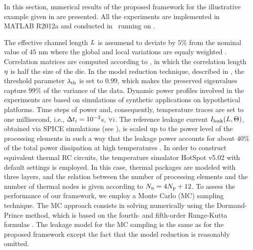 In this section, numerical results of the proposed framework for the illustrative example given in  are presented. All the experiments are implemented in MATLAB R2012a \cite{matlab} and conducted in \hostOS\ running on \hostHardware.

The effective channel length $L$ is assumend to deviate by $5\%$ from the nominal value of $45$ nm where the global and local variations are equaly weighted \cite{juan2011, juan2012}. Correlation matrices are computed according to , in which the correlation length $\eta$ is half the size of the die. In the model reduction technique, described in , the threshold parameter $\lambda_\text{th}$ is set to $0.99$, which makes the preserved eigenvalues capture $99\%$ of the variance of the data. Dynamic power profiles involved in the experiments are based on simulations of synthetic applications on hypothetical platforms. Time steps of power and, consequently, temperature traces are set to one millisecond, i.e., $\Delta t_i = 10^{-3}$s, $\forall i$. The reference leakage current $I_{\text{leak}}(L, \Theta)$, obtained via SPICE simulations (see ), is scaled up to the power level of the processing elements in such a way that the leakage power accounts for about $40\%$ of the total power dissipation at high temperatures \cite{liu2007}. In order to construct equivalent thermal RC circuits, the temperature simulator HotSpot v5.02 \cite{hotspot} with default settings is employed. In this case, thermal packages are modeled with three layers, and the relation between the number of processing elements and the number of thermal nodes is given according to $N_\text{n} = 4 {N_\text{p}} + 12$. To assess the performance of our framework, we employ a Monte Carlo (MC) sampling technique. The MC approach consists in solving  numerically using the Dormand-Prince method, which is based on the fourth- and fifth-order Runge-Kutta formulas \cite{press2007}. The leakage model for the MC sampling is the same as for the proposed framework except the fact that the model reduction is reasonably omitted.

